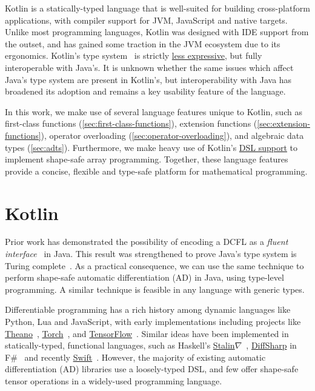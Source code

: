 \documentclass[12pt,initial,twoside,maitrise]{dms}
\numberwithin{equation}{section}
\numberwithin{table}{chapter}
\numberwithin{figure}{chapter}
\begin{document}
Kotlin is a statically-typed language that is well-suited for building cross-platform applications, with compiler support for JVM, JavaScript and native targets. Unlike most programming languages, Kotlin was designed with IDE support from the outset, and has gained some traction in the JVM ecosystem due to its ergonomics. Kotlin's type system~\citep{tate2013mixed} is strictly \href{https://kotlinlang.org/docs/reference/generics.html#variance}{less expressive}, but fully interoperable with Java's. It is unknown whether the same issues which affect Java's type system are present in Kotlin's, but interoperability with Java has broadened its adoption and remains a key usability feature of the language.

In this work, we make use of several language features unique to Kotlin, such as first-class functions (\autoref{sec:first-class-functions}), extension functions (\autoref{sec:extension-functions}), operator overloading (\autoref{sec:operator-overloading}), and algebraic data types (\autoref{sec:adts}). Furthermore, we make heavy use of Kotlin's \href{https://kotlinlang.org/docs/reference/type-safe-builders.html}{DSL support} to implement shape-safe array programming. Together, these language features provide a concise, flexible and type-safe platform for mathematical programming.

\section{Kotlin\textorpdfstring{$\nabla$}}\label{sec:kotlingrad}

Prior work has demonstrated the possibility of encoding a DCFL as a \textit{fluent interface}~\citep{gil2016formal, nakamaru2017silverchain} in Java. This result was strengthened to prove Java's type system is Turing complete~\citep{grigore2017java}. As a practical consequence, we can use the same technique to perform shape-safe automatic differentiation (AD) in Java, using type-level programming. A similar technique is feasible in any language with generic types.

Differentiable programming has a rich history among dynamic languages like Python, Lua and JavaScript, with early implementations including projects like \href{http://deeplearning.net/software/theano/}{Theano}~\citep{bergstra2010theano}, \href{http://torch.ch/}{Torch}~\citep{collobert2002torch}, and \href{http://tensorflow.org/}{TensorFlow}~\citep{abadi2016tensorflow}. Similar ideas have been implemented in statically-typed, functional languages, such as Haskell's \href{https://github.com/Functional-AutoDiff/STALINGRAD}{Stalin$\nabla$}~\citep{pearlmutter2008using}, \href{http://diffsharp.github.io/DiffSharp/}{DiffSharp} in F\#~\citep{baydin2015diffsharp} and recently \href{https://www.tensorflow.org/swift}{Swift}~\citep{lattner2018tensorflow}. However, the majority of existing automatic differentiation (AD) libraries use a loosely-typed DSL, and few offer shape-safe tensor operations in a widely-used programming language.
\end{document}
